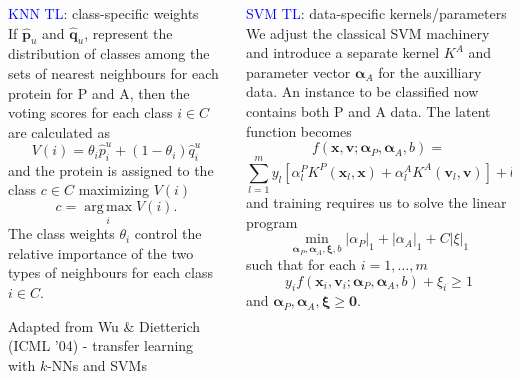 \documentclass[bigger]{beamer}
\newcommand{\bx}{\mathbf{x}}
\newcommand{\bv}{\mathbf{v}}
\newcommand{\bp}{\mathbf{p}}
\newcommand{\bq}{\mathbf{q}}
\newcommand{\bxi}{\bm{\xi}}
\newcommand{\bal}{\bm{\alpha}}
\begin{document}
\begin{frame}

  \begin{columns}[t]
    \begin{column}[T]{0.5\textwidth}\textcolor{Blue}{KNN TL}: class-specific weights\\
    \scriptsize{If $\hat{\bp}_u$
and $\hat{\bq}_u$, represent the distribution of classes among the sets of nearest 
neighbours for each protein for P and A, then the voting scores for each
class $i \in C$ are calculated as \begin{equation*} V(i) = \theta_i
\hat{p}_i^u + (1 - \theta_i) \hat{q}_i^u \label{vtheta} \end{equation*}
and the protein is assigned to the class $c \in C$ maximizing $V(i)$
\[ c = \operatorname*{arg\,max}_i V(i) .  \] The class weights
$\theta_i$ control the relative importance of
the two types of neighbours for each class $i \in C$.}

\vspace{2cm}

{\tiny Adapted from Wu \& Dietterich (ICML '04) - transfer learning with $k$-NNs and SVMs}

    \end{column}
    
    \begin{column}[T]{0.5\textwidth}\textcolor{Blue}{SVM TL}: data-specific kernels/parameters\\
        \scriptsize{We adjust the classical SVM machinery and introduce a
separate kernel $K^A$ and parameter vector $\bal_A$ for the auxilliary
data. An instance to be classified now contains both P and A data. The latent function becomes \[ f(\bx,
\bv; \bal_P, \bal_A, b) =  \]  \[ \sum_{l=1}^m y_l \left[ \alpha_l^P
K^P(\bx_l, \bx) + \alpha_l^A K^A(\bv_l, \bv) \right] + b \] and
training requires us to solve the linear program \begin{equation*}
\min_{\bal_P,\bal_A,\bxi,b} |\alpha_P|_1 + |\alpha_A|_1 + C|\xi|_1
\label{ob2} \end{equation*} such that for each $i = 1,\ldots,m$ \[ y_i
f(\bx_i, \bv_i; \bal_P, \bal_A, b) + \xi_i \geq 1 \] and $\bal_P,
\bal_A, \bxi \geq \bm{0}$.}
    \end{column}
    
  \end{columns}
\end{frame}

\end{document}
